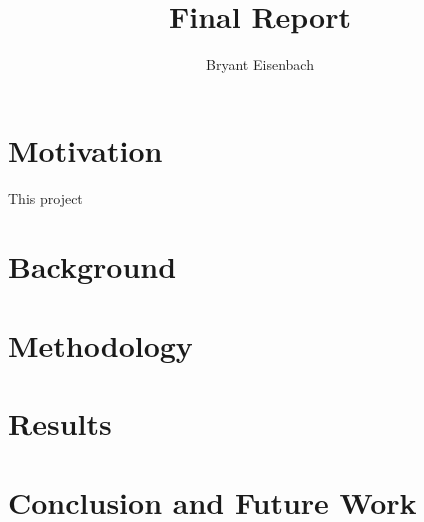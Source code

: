 \documentclass[titlepage]{article}
\author{Bryant Eisenbach}
\title{\project Final Report}
\begin{document}
\section{Motivation}
This project


\section{Background}


\section{Methodology}


\section{Results}


\section{Conclusion and Future Work}



\pagebreak
{}

\end{document}
